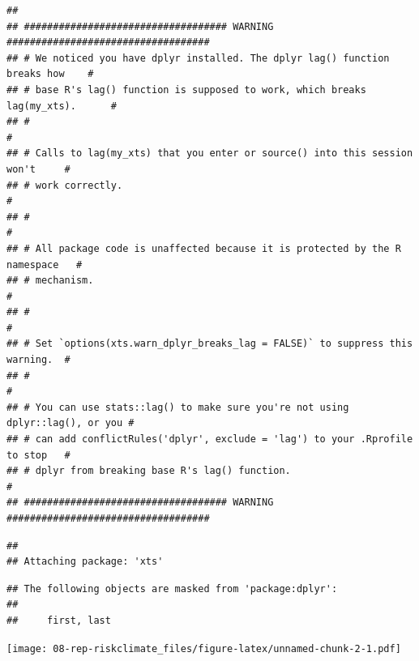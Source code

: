 \documentclass[
  oneside]{book}
\newenvironment{Shaded}{\begin{snugshade}}{\end{snugshade}}
\newcommand{\FunctionTok}[1]{\textcolor[rgb]{0.00,0.00,0.00}{#1}}
\newcommand{\NormalTok}[1]{#1}
\newcommand{\OtherTok}[1]{\textcolor[rgb]{0.56,0.35,0.01}{#1}}
\newcommand{\SpecialCharTok}[1]{\textcolor[rgb]{0.00,0.00,0.00}{#1}}
\begin{document}
\begin{verbatim}
## 
## ################################### WARNING ###################################
## # We noticed you have dplyr installed. The dplyr lag() function breaks how    #
## # base R's lag() function is supposed to work, which breaks lag(my_xts).      #
## #                                                                             #
## # Calls to lag(my_xts) that you enter or source() into this session won't     #
## # work correctly.                                                             #
## #                                                                             #
## # All package code is unaffected because it is protected by the R namespace   #
## # mechanism.                                                                  #
## #                                                                             #
## # Set `options(xts.warn_dplyr_breaks_lag = FALSE)` to suppress this warning.  #
## #                                                                             #
## # You can use stats::lag() to make sure you're not using dplyr::lag(), or you #
## # can add conflictRules('dplyr', exclude = 'lag') to your .Rprofile to stop   #
## # dplyr from breaking base R's lag() function.                                #
## ################################### WARNING ###################################
\end{verbatim}

\begin{verbatim}
## 
## Attaching package: 'xts'
\end{verbatim}

\begin{verbatim}
## The following objects are masked from 'package:dplyr':
## 
##     first, last
\end{verbatim}

\begin{Shaded}
\end{Shaded}

\texttt{[image: 08-rep-riskclimate\_files/figure-latex/unnamed-chunk-2-1.pdf]}
\end{document}
